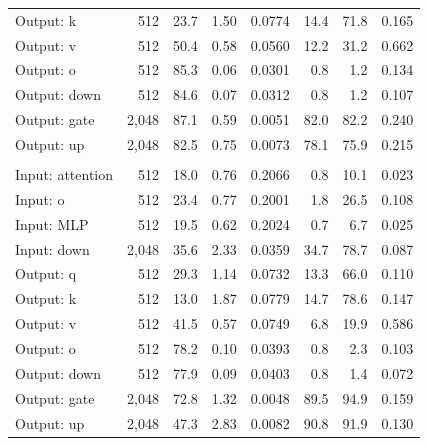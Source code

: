 \begin{table}[tbp]
\begin{tabularx}{\textwidth}{@{}>{\raggedright\arraybackslash}Xrrrrrrr@{}}
Output: k & 512 & 23.7 & 1.50 & 0.0774 & 14.4 & 71.8 & 0.165 \\
Output: v & 512 & 50.4 & 0.58 & 0.0560 & 12.2 & 31.2 & 0.662 \\
Output: o & 512 & 85.3 & 0.06 & 0.0301 & 0.8 & 1.2 & 0.134 \\
Output: down & 512 & 84.6 & 0.07 & 0.0312 & 0.8 & 1.2 & 0.107 \\
Output: gate & 2,048 & 87.1 & 0.59 & 0.0051 & 82.0 & 82.2 & 0.240 \\
Output: up & 2,048 & 82.5 & 0.75 & 0.0073 & 78.1 & 75.9 & 0.215 \\
\addlinespace[4pt]\multicolumn{8}{@{}l}{\textit{WT-MLP-Lag}}\\
Input: attention & 512 & 18.0 & 0.76 & 0.2066 & 0.8 & 10.1 & 0.023 \\
Input: o & 512 & 23.4 & 0.77 & 0.2001 & 1.8 & 26.5 & 0.108 \\
Input: MLP & 512 & 19.5 & 0.62 & 0.2024 & 0.7 & 6.7 & 0.025 \\
Input: down & 2,048 & 35.6 & 2.33 & 0.0359 & 34.7 & 78.7 & 0.087 \\
Output: q & 512 & 29.3 & 1.14 & 0.0732 & 13.3 & 66.0 & 0.110 \\
Output: k & 512 & 13.0 & 1.87 & 0.0779 & 14.7 & 78.6 & 0.147 \\
Output: v & 512 & 41.5 & 0.57 & 0.0749 & 6.8 & 19.9 & 0.586 \\
Output: o & 512 & 78.2 & 0.10 & 0.0393 & 0.8 & 2.3 & 0.103 \\
Output: down & 512 & 77.9 & 0.09 & 0.0403 & 0.8 & 1.4 & 0.072 \\
Output: gate & 2,048 & 72.8 & 1.32 & 0.0048 & 89.5 & 94.9 & 0.159 \\
Output: up & 2,048 & 47.3 & 2.83 & 0.0082 & 90.8 & 91.9 & 0.130 \\
\bottomrule\end{tabularx}
\end{table}

